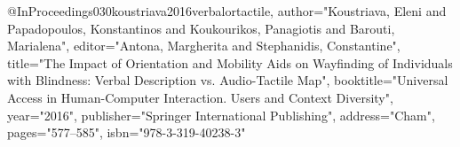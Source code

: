 @InProceedings{030koustriava2016verbalortactile,
author="Koustriava, Eleni
and Papadopoulos, Konstantinos
and Koukourikos, Panagiotis
and Barouti, Marialena",
editor="Antona, Margherita
and Stephanidis, Constantine",
title="The Impact of Orientation and Mobility Aids on Wayfinding of Individuals with Blindness: Verbal Description vs. Audio-Tactile Map",
booktitle="Universal Access in Human-Computer Interaction. Users and Context Diversity",
year="2016",
publisher="Springer International Publishing",
address="Cham",
pages="577--585",
isbn="978-3-319-40238-3"
}